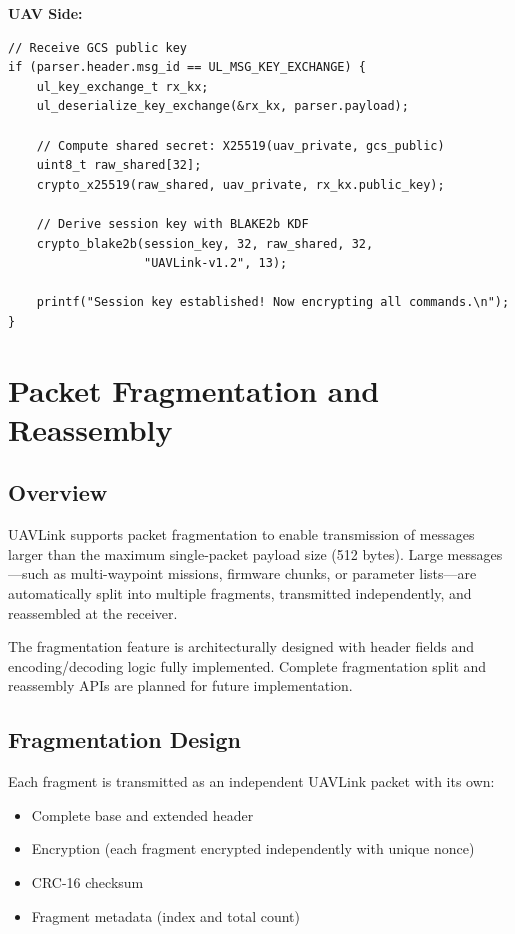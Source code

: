 \documentclass[11pt,a4paper]{article}
\begin{document}
\textbf{UAV Side:}
\begin{lstlisting}[caption={UAV ECDH Session Key Derivation}]
// Receive GCS public key
if (parser.header.msg_id == UL_MSG_KEY_EXCHANGE) {
    ul_key_exchange_t rx_kx;
    ul_deserialize_key_exchange(&rx_kx, parser.payload);
    
    // Compute shared secret: X25519(uav_private, gcs_public)
    uint8_t raw_shared[32];
    crypto_x25519(raw_shared, uav_private, rx_kx.public_key);
    
    // Derive session key with BLAKE2b KDF
    crypto_blake2b(session_key, 32, raw_shared, 32, 
                   "UAVLink-v1.2", 13);
    
    printf("Session key established! Now encrypting all commands.\n");
}
\end{lstlisting}

\newpage
\section{Packet Fragmentation and Reassembly}

\subsection{Overview}

UAVLink supports packet fragmentation to enable transmission of messages larger than the maximum single-packet payload size (512 bytes). Large messages---such as multi-waypoint missions, firmware chunks, or parameter lists---are automatically split into multiple fragments, transmitted independently, and reassembled at the receiver.

\begin{notebox}
The fragmentation feature is architecturally designed with header fields and encoding/decoding logic fully implemented. Complete fragmentation split and reassembly APIs are planned for future implementation.
\end{notebox}

\subsection{Fragmentation Design}

Each fragment is transmitted as an independent UAVLink packet with its own:
\begin{itemize}[noitemsep]
    \item Complete base and extended header
    \item Encryption (each fragment encrypted independently with unique nonce)
    \item CRC-16 checksum
    \item Fragment metadata (index and total count)
\end{itemize}
\end{document}
